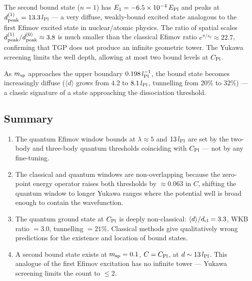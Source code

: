 \noindent
The second bound state ($n=1$) has $E_1=-6.5\times10^{-4}\,E_{\rm Pl}$
and peaks at $d_{\rm peak}^{(1)}=13.3\,l_{\rm Pl}$ — a very diffuse,
weakly-bound excited state analogous to the first Efimov excited state
in nuclear/atomic physics.  The ratio of spatial scales
$d_{\rm peak}^{(1)}/d_{\rm peak}^{(0)}\approx3.8$ is much smaller than
the classical Efimov ratio $e^{\pi/s_0}\approx22.7$, confirming that TGP
does not produce an infinite geometric tower.  The Yukawa screening
limits the well depth, allowing at most two bound levels at $C_{\rm Pl}$.

As $m_{\rm sp}$ approaches the upper boundary $0.198\,l_{\rm Pl}^{-1}$,
the bound state becomes increasingly diffuse
($\langle d\rangle$ grows from $4.2$ to $8.1\,l_{\rm Pl}$,
tunnelling from $20\%$ to $32\%$) — a classic signature of a
state approaching the dissociation threshold.

\subsection{Summary}

\begin{enumerate}
\item The quantum Efimov window bounds at $\lambda\approx5$ and
  $13\,l_{\rm Pl}$ are set by the two-body and three-body quantum
  thresholds coinciding with $C_{\rm Pl}$ — not by any fine-tuning.
\item The classical and quantum windows are non-overlapping because the
  zero-point energy operator raises both thresholds by $\approx0.063$ in $C$,
  shifting the quantum window to longer Yukawa ranges where the potential
  well is broad enough to contain the wavefunction.
\item The quantum ground state at $C_{\rm Pl}$ is deeply non-classical:
  $\langle d\rangle/d_{\rm cl}=3.3$, WKB ratio $=3.0$, tunnelling $=21\%$.
  Classical methods give qualitatively wrong predictions for the existence
  and location of bound states.
\item A second bound state exists at $m_{\rm sp}=0.1$, $C=C_{\rm Pl}$,
  at $d\sim13\,l_{\rm Pl}$.  This analogue of the first Efimov excitation
  has no infinite tower — Yukawa screening limits the count to $\leq2$.
\end{enumerate}
